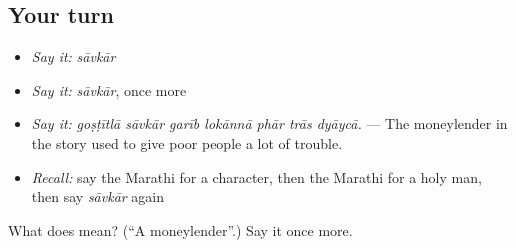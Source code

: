 \subsection*{Your turn}
\begin{itemize}
\raggedright
  \item \emph{Say it:} \emph{sāvkār}
  \item \emph{Say it:} \emph{sāvkār}, once more
  \item \emph{Say it:} \emph{goṣṭītlā sāvkār garīb lokānnā phār trās dyāycā.} — The moneylender in the story used to give poor people a lot of trouble.
  \item \emph{Recall:} say the Marathi for a character, then the Marathi for a holy man, then say \emph{sāvkār} again
\end{itemize}

\begin{tcolorbox}[breakable,colback=teal!4,colframe=teal!35!black,title={Before you move on}]
What does  mean? (\textquotedblleft{}A moneylender\textquotedblright{}.) Say it once more.
\end{tcolorbox}
